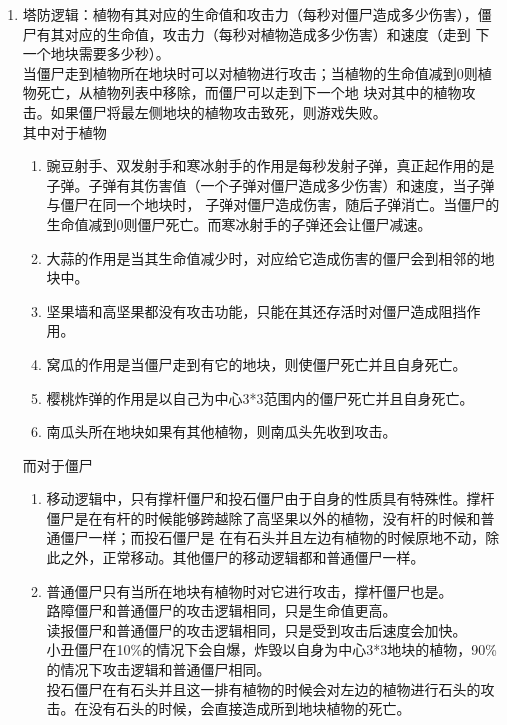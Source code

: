 \documentclass[12pt,a4paper,UTF8]{article}
\begin{document}
        \begin{enumerate}
          \item 塔防逻辑：植物有其对应的生命值和攻击力（每秒对僵尸造成多少伤害），僵尸有其对应的生命值，攻击力（每秒对植物造成多少伤害）和速度（走到
          下一个地块需要多少秒）。\\
                        当僵尸走到植物所在地块时可以对植物进行攻击；当植物的生命值减到0则植物死亡，从植物列表中移除，而僵尸可以走到下一个地
            块对其中的植物攻击。如果僵尸将最左侧地块的植物攻击致死，则游戏失败。\\
            其中对于植物
          \begin{enumerate}
            \item 豌豆射手、双发射手和寒冰射手的作用是每秒发射子弹，真正起作用的是子弹。子弹有其伤害值（一个子弹对僵尸造成多少伤害）和速度，当子弹与僵尸在同一个地块时，
            子弹对僵尸造成伤害，随后子弹消亡。当僵尸的生命值减到0则僵尸死亡。而寒冰射手的子弹还会让僵尸减速。
            \item 大蒜的作用是当其生命值减少时，对应给它造成伤害的僵尸会到相邻的地块中。
            \item 坚果墙和高坚果都没有攻击功能，只能在其还存活时对僵尸造成阻挡作用。
            \item 窝瓜的作用是当僵尸走到有它的地块，则使僵尸死亡并且自身死亡。
            \item 樱桃炸弹的作用是以自己为中心3*3范围内的僵尸死亡并且自身死亡。
            \item 南瓜头所在地块如果有其他植物，则南瓜头先收到攻击。
          \end{enumerate}
          而对于僵尸
          \begin{enumerate}
            \item  移动逻辑中，只有撑杆僵尸和投石僵尸由于自身的性质具有特殊性。撑杆僵尸是在有杆的时候能够跨越除了高坚果以外的植物，没有杆的时候和普通僵尸一样；而投石僵尸是
            在有石头并且左边有植物的时候原地不动，除此之外，正常移动。其他僵尸的移动逻辑都和普通僵尸一样。
            \item 普通僵尸只有当所在地块有植物时对它进行攻击，撑杆僵尸也是。\\
                  路障僵尸和普通僵尸的攻击逻辑相同，只是生命值更高。\\
                  读报僵尸和普通僵尸的攻击逻辑相同，只是受到攻击后速度会加快。\\
                  小丑僵尸在10\%的情况下会自爆，炸毁以自身为中心3*3地块的植物，90\%的情况下攻击逻辑和普通僵尸相同。\\
                  投石僵尸在有石头并且这一排有植物的时候会对左边的植物进行石头的攻击。在没有石头的时候，会直接造成所到地块植物的死亡。\\
          \end{enumerate}


\end{enumerate}
\end{document}
